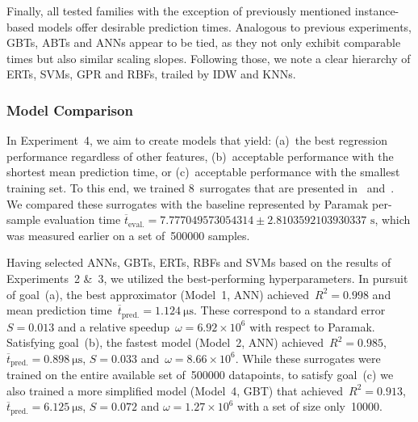 Finally, all tested families with the exception of previously mentioned instance-based
models offer desirable prediction times. Analogous to previous experiments,
GBTs, ABTs and ANNs appear to be tied, as they not only exhibit
comparable times but also similar scaling slopes. Following those, we note a
clear hierarchy of ERTs, SVMs, GPR and RBFs, trailed by IDW and KNNs.


\subsubsection{Model Comparison}
\label{sec:res-exp4}
{
In Experiment~4, we aim to create models that yield:
(a)~the best regression performance regardless
of other features, (b)~acceptable performance with the shortest mean
prediction time, or (c)~acceptable performance with the smallest training set.
To this end, we trained 8~surrogates that are presented in~
and~. We compared these
surrogates with the baseline represented by Paramak per-sample evaluation time $\overline{t}_{\text{eval.}}=\num{7.777049573054314} \pm
\num{2.8103592103930337} \text{ s}$, which was measured earlier on a set of~\num{500000} samples.
}

Having selected ANNs, GBTs, ERTs, RBFs and SVMs based on the results of
Experiments~2 \&~3, we utilized the best-performing hyperparameters.
In pursuit of goal~(a), the best approximator (Model~1,
ANN) achieved~$R^2=\num{0.998}$ and mean prediction
time~$\overline{t}_{\text{pred.}}=\SI{1.124}{\micro\second}$. These correspond
to a standard error~$S=\num{0.013}$ and a relative speedup~$\omega=\num{6.92} \times {10^6}$
with respect to Paramak. Satisfying
goal~(b), the fastest model (Model~2, ANN) achieved~$R^2=\num{0.985}$,
$\overline{t}_{\text{pred.}}=\SI{0.898}{\micro\second}$, $S=\num{0.033}$
and~$\omega=\num{8.66} \times {10^6}$.
While these surrogates
were trained on the entire available set of~\num{500000} datapoints, to satisfy
goal~(c) we also trained a more simplified model (Model~4, GBT)
that achieved~$R^2=\num{0.913}$,
$\overline{t}_{\text{pred.}}=\SI{6.125}{\micro\second}$, $S=\num{0.072}$ and $\omega=\num{1.27} \times {10^6}$
with a set of size only~\num{10000}.


